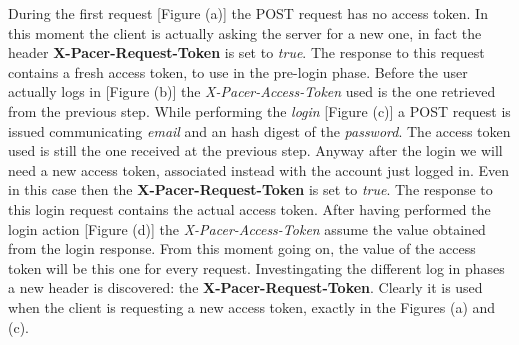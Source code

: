 			\par	During the first request [Figure (a)] the POST request has no access token. In this moment the client is actually asking the server for a new one, in fact the header \textbf{X-Pacer-Request-Token} is set to \textit{true}. The response to this request contains a fresh access token, to use in the pre-login phase. \newline
			Before the user actually logs in [Figure (b)] the \textit{X-Pacer-Access-Token} used is the one retrieved from the previous step. \newline
			While performing the \textit{login} [Figure (c)] a POST request is issued communicating \textit{email} and an hash digest of the \textit{password}. The access token used is still the one received at the previous step. Anyway after the login we will need a new access token, associated instead with the account just logged in. Even in this case then the \textbf{X-Pacer-Request-Token} is set to \textit{true}. The response to this login request contains the actual access token.
			After having performed the login action [Figure (d)] the \textit{X-Pacer-Access-Token} assume the value obtained from the login response. From this moment going on, the value of the access token will be this one for every request.\newline
			Investingating the different log in phases a new header is discovered: the \textbf{X-Pacer-Request-Token}. Clearly it is used when the client is requesting a new access token, exactly in the Figures (a) and (c).
			

